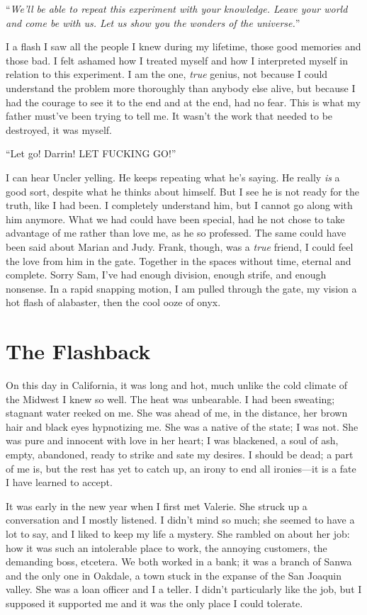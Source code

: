 ``\emph{We'll be able to repeat this experiment with your knowledge.
Leave your world and come be with us. Let us show you the wonders of the
universe.}''

I a flash I saw all the people I knew during my lifetime, those good
memories and those bad. I felt ashamed how I treated myself and how I
interpreted myself in relation to this experiment. I am the one,
\emph{true} genius, not because I could understand the problem more
thoroughly than anybody else alive, but because I had the courage to see
it to the end and at the end, had no fear. This is what my father
must've been trying to tell me. It wasn't the work that needed to be
destroyed, it was myself.

``Let go! Darrin! LET FUCKING GO!''

I can hear Uncler yelling. He keeps repeating what he's saying. He
really \emph{is} a good sort, despite what he thinks about himself. But
I see he is not ready for the truth, like I had been. I completely
understand him, but I cannot go along with him anymore. What we had
could have been special, had he not chose to take advantage of me rather
than love me, as he so professed. The same could have been said about
Marian and Judy. Frank, though, was a \emph{true} friend, I could feel
the love from him in the gate. Together in the spaces without time,
eternal and complete. Sorry Sam, I've had enough division, enough
strife, and enough nonsense. In a rapid snapping motion, I am pulled
through the gate, my vision a hot flash of alabaster, then the cool ooze
of onyx.

\chapter{The Flashback}\label{the-flashback}

On this day in California, it was long and hot, much unlike the cold
climate of the Midwest I knew so well. The heat was unbearable. I had
been sweating; stagnant water reeked on me. She was ahead of me, in the
distance, her brown hair and black eyes hypnotizing me. She was a native
of the state; I was not. She was pure and innocent with love in her
heart; I was blackened, a soul of ash, empty, abandoned, ready to strike
and sate my desires. I should be dead; a part of me is, but the rest has
yet to catch up, an irony to end all ironies---it is a fate I have
learned to accept.

It was early in the new year when I first met Valerie. She struck up a
conversation and I mostly listened. I didn't mind so much; she seemed to
have a lot to say, and I liked to keep my life a mystery. She rambled on
about her job: how it was such an intolerable place to work, the
annoying customers, the demanding boss, etcetera. We both worked in a
bank; it was a branch of Sanwa and the only one in Oakdale, a town stuck
in the expanse of the San Joaquin valley. She was a loan officer and I a
teller. I didn't particularly like the job, but I supposed it supported
me and it was the only place I could tolerate.

